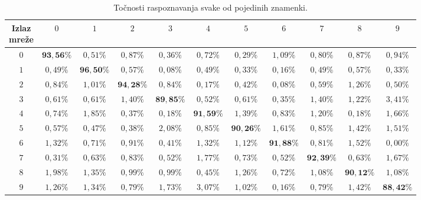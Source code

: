 \begin{table}[htb]
    \caption{Točnosti raspoznavanja svake od pojedinih znamenki.}
    \label{tab:per-number-results}
    \scriptsize
    \centering
    \setlength{\tabcolsep}{0.05cm}
    \begin{tabular}{|c|c|c|c|c|c|c|c|c|c|c|}
        \hline
        \diagbox{Očekivana\\znamenka}{Izlaz\\mreže} & $0$ & $1$ & $2$ & $3$ & $4$ & $5$ & $6$ & $7$ & $8$ & $9$ \\
        \hline
        $0$ & $\boldsymbol{93,56\%}$ & $0,51\%$ & $0,87\%$ & $0,36\%$ & $0,72\%$ & $0,29\%$ & $1,09\%$ & $0,80\%$
        & $0,87\%$ & $0,94\%$ \\
        \hline
        $1$ & $0,49\%$ & $\boldsymbol{96,50\%}$ & $0,57\%$ & $0,08\%$ & $0,49\%$ & $0,33\%$ & $0,16\%$ & $0,49\%$
        & $0,57\%$ & $0,33\%$ \\
        \hline
        $2$ & $0,84\%$ & $1,01\%$ & $\boldsymbol{94,28\%}$ & $0,84\%$ & $0,17\%$ & $0,42\%$ & $0,08\%$ & $0,59\%$
        & $1,26\%$ & $0,50\%$ \\
        \hline
        $3$ & $0,61\%$ & $0,61\%$ & $1,40\%$ & $\boldsymbol{89,85\%}$ & $0,52\%$ & $0,61\%$ & $0,35\%$ & $1,40\%$
        & $1,22\%$ & $3,41\%$ \\
        \hline
        $4$ & $0,74\%$ & $1,85\%$ & $0,37\%$ & $0,18\%$ & $\boldsymbol{91,59\%}$ & $1,39\%$ & $0,83\%$ & $1,20\%$
        & $0,18\%$ & $1,66\%$ \\
        \hline
        $5$ & $0,57\%$ & $0,47\%$ & $0,38\%$ & $2,08\%$ & $0,85\%$ & $\boldsymbol{90,26\%}$ & $1,61\%$ & $0,85\%$
        & $1,42\%$ & $1,51\%$ \\
        \hline
        $6$ & $1,32\%$ & $0,71\%$ & $0,91\%$ & $0,41\%$ & $1,32\%$ & $1,12\%$ & $\boldsymbol{91,88\%}$ & $0,81\%$
        & $1,52\%$ & $0,00\%$ \\
        \hline
        $7$ & $0,31\%$ & $0,63\%$ & $0,83\%$ & $0,52\%$ & $1,77\%$ & $0,73\%$ & $0,52\%$ & $\boldsymbol{92,39\%}$
        & $0,63\%$ & $1,67\%$ \\
        \hline
        $8$ & $1,98\%$ & $1,35\%$ & $0,99\%$ & $0,99\%$ & $0,45\%$ & $1,26\%$ & $0,72\%$ & $1,08\%$
        & $\boldsymbol{90,12\%}$ & $1,08\%$ \\
        \hline
        $9$ & $1,26\%$ & $1,34\%$ & $0,79\%$ & $1,73\%$ & $3,07\%$ & $1,02\%$ & $0,16\%$ & $0,79\%$
        & $1,42\%$ & $\boldsymbol{88,42\%}$ \\
        \hline
    \end{tabular}
\end{table}
